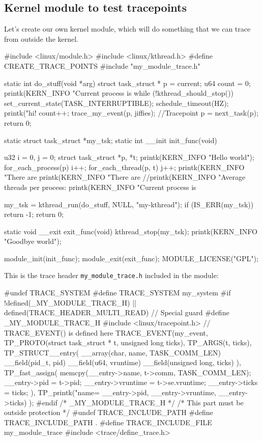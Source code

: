 \documentclass[10pt, oneside]{book}
\begin{document}
\subsection{Kernel module to test tracepoints}
\label{sec:module}
Let's create our own kernel module, which will do something that we can trace from outside the kernel.
\begin{code}
#include <linux/module.h>
#include <linux/kthread.h>
#define CREATE_TRACE_POINTS
#include "my_module_trace.h"

static int do_stuff(void *arg){
  struct task_struct * p = current;
  u64 count = 0;
  printk(KERN_INFO "Current process is %
  while (!kthread_should_stop()){
    set_current_state(TASK_INTERRUPTIBLE);
    schedule_timeout(HZ);
    printk("hi! %
    count++;
    trace_my_event(p, jiffies); //Tracepoint
    p = next_task(p);
  }
  return 0;
}

static struct task_struct *my_tsk;
static int __init init_func(void){
  u32 i = 0, j = 0;
  struct task_struct *p, *t;
  printk(KERN_INFO "Hello world\n");
  for_each_process(p){
    i++;
    for_each_thread(p, t){
      j++;
    }
  }
  printk(KERN_INFO "There are %
  printk(KERN_INFO "There are %
  //printk(KERN_INFO "Average threads per process: %
  printk(KERN_INFO "Current process is %
  
  my_tsk = kthread_run(do_stuff, NULL, "my-kthread");
  if (IS_ERR(my_tsk))
    return -1;
  return 0;
}

static void __exit exit_func(void){
  kthread_stop(my_tsk);
  printk(KERN_INFO "Goodbye world\n");
}

module_init(init_func);
module_exit(exit_func);
MODULE_LICENSE("GPL");
\end{code}
This is the trace header \verb|my_module_trace.h| included in the module:
\begin{code}
#undef TRACE_SYSTEM
#define TRACE_SYSTEM my_system
#if !defined(_MY_MODULE_TRACE_H) || defined(TRACE_HEADER_MULTI_READ) // Special guard
#define _MY_MODULE_TRACE_H
#include <linux/tracepoint.h> // TRACE_EVENT() is defined here
TRACE_EVENT(my_event,
  TP_PROTO(struct task_struct * t, unsigned long ticks),
  TP_ARGS(t, ticks),
  TP_STRUCT__entry(
    __array(char, name, TASK_COMM_LEN)
    __field(pid_t, pid)
    __field(u64, vruntime)
    __field(unsigned long, ticks)
  ),
  TP_fast_assign(
    memcpy(__entry->name, t->comm, TASK_COMM_LEN);
    __entry->pid  = t->pid;
    __entry->vruntime = t->se.vruntime;
    __entry->ticks = ticks;
  ),
  TP_printk("name=%
  __entry->pid, __entry->vruntime, __entry->ticks)
);
#endif /* _MY_MODULE_TRACE_H */
/* This part must be outside protection */
#undef TRACE_INCLUDE_PATH
#define TRACE_INCLUDE_PATH .
#define TRACE_INCLUDE_FILE my_module_trace
#include <trace/define_trace.h>
\end{code}
\end{document}
